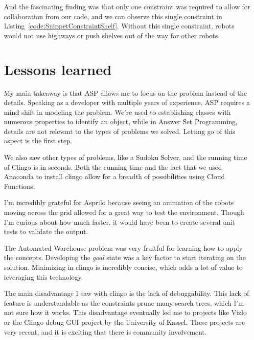\documentclass{IEEEtran}
\begin{document}
And the fascinating finding was that only one constraint was required to allow for collaboration from our code, and we can observe this single constraint in Listing~\ref{code:SnippetConstraintShelf}. Without this single constraint, robots would not use highways or push shelves out of the way for other robots. 

\section{Lessons learned}

My main takeaway is that ASP allows me to focus on the problem instead of the details. Speaking as a developer with multiple years of experience, ASP requires a mind shift in modeling the problem. We're used to establishing classes with numerous properties to identify an object, while in Answer Set Programming, details are not relevant to the types of problems we solved. Letting go of this aspect is the first step.

We also saw other types of problems, like a Sudoku Solver, and the running time of Clingo is in seconds. Both the running time and the fact that we used Anaconda to install clingo allow for a breadth of possibilities using Cloud Functions.

I'm incredibly grateful for Asprilo because seeing an animation of the robots moving across the grid allowed for a great way to test the environment. Though I'm curious about how much faster, it would have been to create several unit tests to validate the output. 

The Automated Warehouse problem was very fruitful for learning how to apply the concepts. Developing the \textit{goal} state was a key factor to start iterating on the solution. Minimizing in clingo is incredibly concise, which adds a lot of value to leveraging this technology.

The main disadvantage I saw with clingo is the lack of debuggability. This lack of feature is understandable as the constraints prune many search trees, which I'm not sure how it works. This disadvantage eventually led me to projects like Vizlo\cite{cse579:vizlo} or the Clingo debug GUI project by the University of Kassel\cite{cse579:clingo-debug-gui}. These projects are very recent, and it is exciting that there is community involvement.



\end{document}
